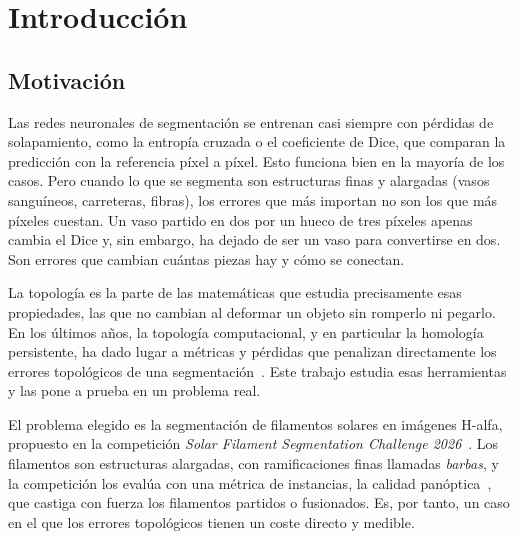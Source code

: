 
\chapter{Introducción}
\label{cap:introduccion}

\section{Motivación}

Las redes neuronales de segmentación se entrenan casi siempre con
pérdidas de solapamiento, como la entropía cruzada o el coeficiente de
Dice, que comparan la predicción con la referencia píxel a píxel. Esto
funciona bien en la mayoría de los casos. Pero cuando lo que se segmenta
son estructuras finas y alargadas (vasos sanguíneos, carreteras,
fibras), los errores que más importan no son los que más píxeles
cuestan. Un vaso partido en dos por un hueco de tres píxeles apenas
cambia el Dice y, sin embargo, ha dejado de ser un vaso para convertirse
en dos. Son errores que cambian cuántas piezas hay y cómo se conectan.

La topología es la parte de las matemáticas que estudia precisamente
esas propiedades, las que no cambian al deformar un objeto sin romperlo
ni pegarlo. En los últimos años, la topología computacional, y en
particular la homología persistente, ha dado lugar a métricas y pérdidas
que penalizan directamente los errores topológicos de una
segmentación~\cite{hu2019,shit2021,stucki2023,lux2025}. Este trabajo
estudia esas herramientas y las pone a prueba en un problema real.

El problema elegido es la segmentación de filamentos solares en
imágenes H-alfa, propuesto en la competición \emph{Solar Filament
Segmentation Challenge 2026}~\cite{kaggle2026}. Los filamentos son
estructuras alargadas, con ramificaciones finas llamadas \emph{barbas},
y la competición los evalúa con una métrica de instancias, la calidad
panóptica~\cite{kirillov2019}, que castiga con fuerza los filamentos
partidos o fusionados. Es, por tanto, un caso en el que los errores
topológicos tienen un coste directo y medible.

